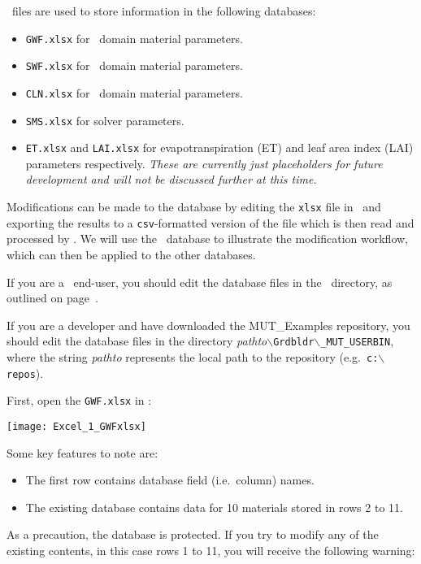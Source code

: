 \label{Appendix:ExcelUseage}
\excel\ files are used to store information in the following databases:
\begin{itemize}
  \item \texttt{GWF.xlsx} for \gwf\ domain material parameters.
  \item \texttt{SWF.xlsx} for \swf\ domain material parameters.
  \item \texttt{CLN.xlsx} for \cln\ domain material parameters.
  \item \texttt{SMS.xlsx} for solver parameters.
  \item \texttt{ET.xlsx} and  \texttt{LAI.xlsx} for evapotranspiration (ET) and leaf area index (LAI) parameters respectively.  {\em These are currently just placeholders for future development and will not be discussed further at this time.}
\end{itemize}

Modifications can be made to the database by editing the \texttt{xlsx} file in \excel\ and exporting the results to a \texttt{csv}-formatted version of the file which is then read and processed by \mut.  We will use the \gwf\ database to illustrate the modification workflow, which can then be applied to the other databases.

If you are a \mut\ end-user, you should edit the database files in the \bin\ directory, as outlined on page~\pageref{page:userbin}.

If you are a developer and have downloaded the MUT\_Examples repository, you should edit the database files in the directory \textit{pathto}\texttt{$\backslash$Grdbldr$\backslash$\_MUT\_USERBIN},
where the string \textit{pathto} represents the local path to the repository (e.g.\ \texttt{c:$\backslash$repos}).

First, open the \texttt{GWF.xlsx} in \excel:

    \texttt{[image: Excel\_1\_GWFxlsx]}

Some key features to note are:
\begin{itemize}
    \item The first row contains database field (i.e.\ column) names.
    \item The existing database contains data for 10 materials stored in rows 2 to 11.
\end{itemize}

As a precaution, the database is protected.  If you try to modify any of the existing contents, in this case rows 1 to 11, you will receive the following warning:


